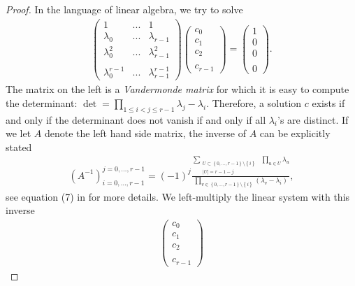 \begin{proof}
    In the language of linear algebra, we try to solve
    \begin{align*}
        \begin{pmatrix}
            1 & ... & 1 \\
            \lambda_0 & ... & \lambda_{r-1} \\
            \lambda_0^2 & ... & \lambda_{r-1}^2 \\
            & & \\
            \lambda_0^{r-1} & ... & \lambda_{r-1}^{r-1}
        \end{pmatrix}
        \begin{pmatrix}
            c_0 \\ c_1 \\ c_2 \\ \\ c_{r-1}
        \end{pmatrix}
        = 
        \begin{pmatrix}
            1 \\ 0 \\ 0 \\ \\ 0
        \end{pmatrix}.
    \end{align*}
    The matrix on the left is a \emph{Vandermonde matrix} for which it is easy to compute the determinant: \(\det = \prod_{1 \leq i < j \leq r - 1} \lambda_j  - \lambda_i\). Therefore, a solution \(c\) exists if and only if the determinant does not vanish if and only if all \(\lambda_i\)'s are distinct. If we let \(A\) denote the left hand side matrix, the inverse of \(A\)  can be explicitly stated 
    \begin{align*}
        (A^{-1})_{i=0,\ldots,r-1}^{j=0,\ldots,r-1} = (-1)^j \frac{\sum\limits_{\substack{U \subset \left\{ 0,\ldots,r-1 \right\} \setminus \left\{ i \right\} \\ |U| = r - 1 -j}} \; \prod\limits_{u \in U} \lambda_u}{\prod\limits_{v \in \left\{ 0,\ldots,r-1 \right\} \setminus \left\{ i \right\}} (\lambda_v - \lambda_i)},
    \end{align*}
    see equation (7) in \cite{klinger1965vandermonde} for more details. We left-multiply the linear system with this inverse
    \begin{align*}
        \begin{pmatrix}
            c_0 \\ c_1 \\ c_2 \\ \\ c_{r-1}

\end{pmatrix}
\end{align*}
\end{proof}

